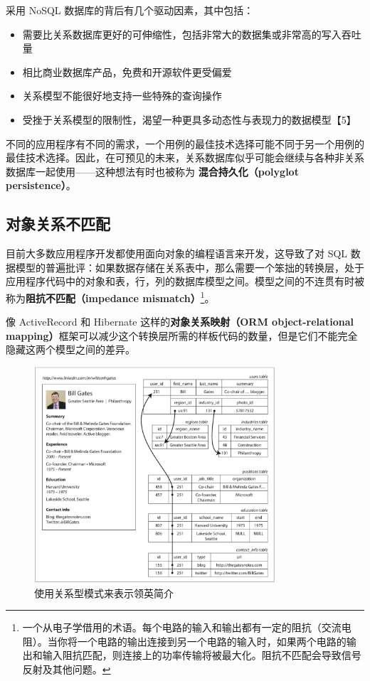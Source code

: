采用 NoSQL 数据库的背后有几个驱动因素，其中包括：

\begin{itemize}
    \item 需要比关系数据库更好的可伸缩性，包括非常大的数据集或非常高的写入吞吐量
    \item 相比商业数据库产品，免费和开源软件更受偏爱
    \item 关系模型不能很好地支持一些特殊的查询操作
    \item 受挫于关系模型的限制性，渴望一种更具多动态性与表现力的数据模型【5】
\end{itemize}

不同的应用程序有不同的需求，一个用例的最佳技术选择可能不同于另一个用例的最佳技术选择。因此，在可预见的未来，关系数据库似乎可能会继续与各种非关系数据库一起使用——这种想法有时也被称为 \textbf{混合持久化（polyglot persistence）}。

\subsection{对象关系不匹配}

目前大多数应用程序开发都使用面向对象的编程语言来开发，这导致了对 SQL 数据模型的普遍批评：如果数据存储在关系表中，那么需要一个笨拙的转换层，处于应用程序代码中的对象和表，行，列的数据库模型之间。模型之间的不连贯有时被称为\textbf{阻抗不匹配（impedance mismatch）}\footnote{一个从电子学借用的术语。每个电路的输入和输出都有一定的阻抗（交流电阻）。当你将一个电路的输出连接到另一个电路的输入时，如果两个电路的输出和输入阻抗匹配，则连接上的功率传输将被最大化。阻抗不匹配会导致信号反射及其他问题。}。

像 ActiveRecord 和 Hibernate 这样的\textbf{对象关系映射（ORM object-relational mapping）}框架可以减少这个转换层所需的样板代码的数量，但是它们不能完全隐藏这两个模型之间的差异。

\begin{figure}
    \includegraphics[width=0.8\textwidth]{img/fig2-1.png}
    \caption{使用关系型模式来表示领英简介}
    \label{fig:fig2-1}
\end{figure}

